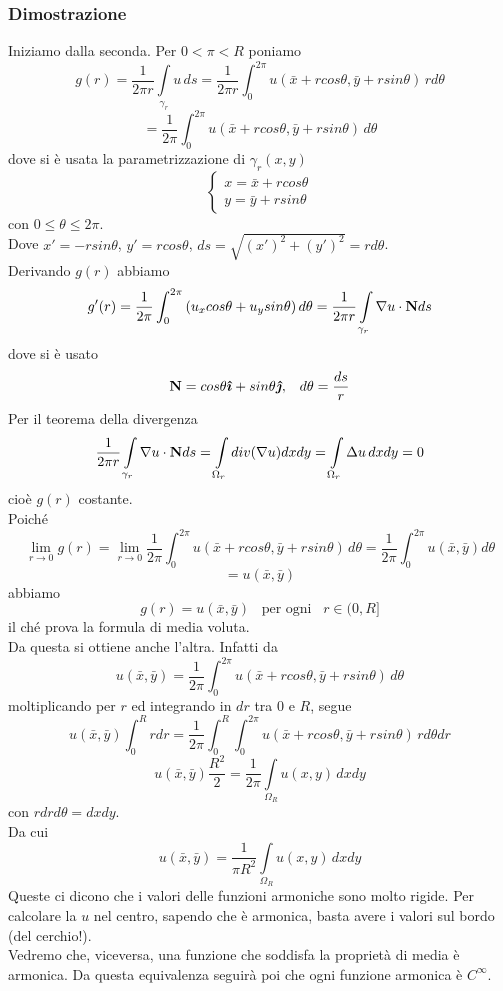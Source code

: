 \subsubsection{Dimostrazione}
Iniziamo dalla seconda. Per $0<\pi<R$ poniamo
\[
	g(r)= \frac{1}{2\pi r}
	\int \limits_{\gamma_r}
	u \, ds=
	\frac{1}{2\pi r}
	\int_0^{2\pi}
	u(\bar{x}+rcos \theta, \bar{y} + rsin \theta) \, r d\theta
\]
\[
	= \frac{1}{2\pi}
	\int_0^{2\pi}
	u(\bar{x}+rcos \theta, \bar{y} + rsin \theta) \, d\theta
\]
dove si \`e usata la parametrizzazione di $\gamma_r(x,y)$
\[
	\left\{
		\begin{array}{l}
			x= \bar{x} + rcos\theta \\
			y= \bar{y} + rsin\theta
		\end{array}
	\right.
\]
con $0 \leq \theta \leq 2\pi$.\\
Dove $x'=-rsin \theta$, $y'= rcos \theta$, $ds= \sqrt{(x')^2+ (y')^2}=
rd\theta$.\\
Derivando $g(r)$ abbiamo
\[
	g'(r)= \frac{1}{2\pi}
	\int_0^{2\pi}
	\left(
		u_x cos\theta + u_y sin \theta
	\right)d\theta=
	\frac{1}{2\pi r}
	\int \limits_{\gamma_r} \nabla u \cdot {\bf N} ds
\]
dove si \`e usato
\[
	{\bf N} = cos\theta \boldsymbol{\hat{\imath}} + sin \theta \boldsymbol{\hat{\jmath}} , \;\;\;
	d\theta= \frac{ds}{r}
\]
Per il teorema della divergenza
\[
	\frac{1}{2\pi r}
	\int \limits_{\gamma_r} \nabla u \cdot {\bf N} ds=
	\int \limits_{\Omega_r} div (\nabla u) dxdy=
	\int \limits_{\Omega_r} \Delta u \, dxdy= 0
\]
cio\`e $g(r)$ costante.\\
Poich\'e
\[
	\lim_{r \to 0} g(r)=
	\lim_{r \to 0} \frac{1}{2 \pi}
	\int_0^{2\pi}
	u(\bar{x}+rcos \theta, \bar{y} + rsin \theta) \, d\theta=
	\frac{1}{2 \pi} \int_0^{2\pi}
	u(\bar{x}, \bar{y}) d\theta
\]
\[
	= u(\bar{x}, \bar{y})
\]
abbiamo
\[
	g(r)= u(\bar{x}, \bar{y}) \;\;\; \text{per ogni} \;\;\; r \in (0,R]
\]
il ch\'e prova la formula di media voluta.\\
Da questa si ottiene anche l'altra. Infatti da
\[
	u(\bar{x}, \bar{y})=
	\frac{1}{2 \pi} \int_0^{2 \pi}
	u(\bar{x}+rcos \theta, \bar{y} + rsin \theta) \, d\theta
\]
moltiplicando per $r$ ed integrando in $dr$ tra $0$ e $R$, segue
\[
	u(\bar{x}, \bar{y})\int_0^R rdr=
	\frac{1}{2\pi}\int_0^R
	\int_0^{2\pi}
	u(\bar{x}+rcos \theta, \bar{y} + rsin \theta) \, rd\theta dr
\]
\[
	u(\bar{x}, \bar{y})\frac{R^2}{2}=
	\frac{1}{2\pi} \int \limits_{\Omega_R} u(x,y) \, dxdy
\]
con $rdrd\theta= dxdy$.\\
Da cui
\[
	u(\bar{x}, \bar{y})=
	\frac{1}{\pi R^2}
	\int \limits_{\Omega_R} u(x,y) \, dxdy
\]
Queste ci dicono che i valori delle funzioni armoniche sono molto rigide.
Per calcolare la $u$ nel centro, sapendo che \`e armonica, basta avere i
valori sul bordo (del cerchio!).\\
Vedremo che, viceversa, una funzione che soddisfa la propriet\`a di media \`e
armonica. Da questa equivalenza seguir\`a poi che ogni funzione armonica \`e
$C^{\infty}$.
